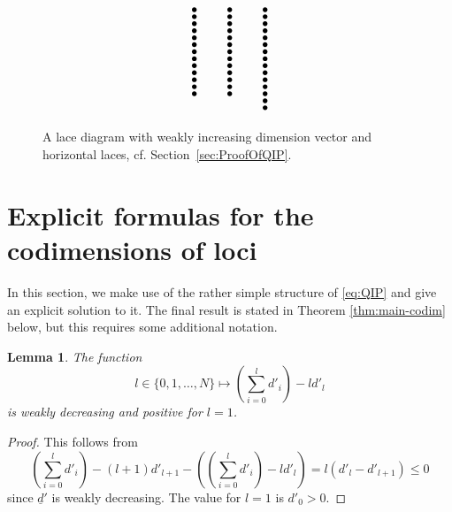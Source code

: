 \documentclass[a4paper]{amsart}
\newcommand{\ud}{\underline{d}}
\newtheorem{lemma}[thm]{Lemma}
\theoremstyle{plain}
\begin{document}
\begin{figure}
\begin{equation*}
\begin{tikzpicture}[baseline=-12]
 \node at (5,0)  {$\bullet$};
 \node at (5,-.2)  {$\bullet$};
 \node at (5,-.4)  {$\bullet$};
 \node at (5,-.6)  {$\bullet$};
 \node at (5,-.8)  {$\bullet$};
 \node at (5,-1)  {$\bullet$};
 \node at (5,-1.2)  {$\bullet$};
 \node at (5,-1.4)  {$\bullet$};
 \node at (5,-1.6)  {$\bullet$};
 \node at (5,-1.8)  {$\bullet$};
 \node at (5,-2)  {$\bullet$};
 \node at (5,-2.2)  {$\bullet$};
 \node at (5,-2.4)  {$\bullet$};

 \node at (6,0)  {$\bullet$};
 \node at (6,-.2)  {$\bullet$};
 \node at (6,-.4)  {$\bullet$};
 \node at (6,-.6)  {$\bullet$};
 \node at (6,-.8)  {$\bullet$};
 \node at (6,-1)  {$\bullet$};
 \node at (6,-1.2)  {$\bullet$};
 \node at (6,-1.4)  {$\bullet$};
 \node at (6,-1.6)  {$\bullet$};
 \node at (6,-1.8)  {$\bullet$};
 \node at (6,-2)  {$\bullet$};
 \node at (6,-2.2)  {$\bullet$};
 \node at (6,-2.4)  {$\bullet$};

 \node at (7,0)  {$\bullet$};
 \node at (7,-.2)  {$\bullet$};
 \node at (7,-.4)  {$\bullet$};
 \node at (7,-.6)  {$\bullet$};
 \node at (7,-.8)  {$\bullet$};
 \node at (7,-1)  {$\bullet$};
 \node at (7,-1.2)  {$\bullet$};
 \node at (7,-1.4)  {$\bullet$};
 \node at (7,-1.6)  {$\bullet$};
 \node at (7,-1.8)  {$\bullet$};
 \node at (7,-2)  {$\bullet$};
 \node at (7,-2.2)  {$\bullet$};
 \node at (7,-2.4)  {$\bullet$};
 \node at (7,-2.6)  {$\bullet$}; 
 \node at (7,-2.8)  {$\bullet$}; 

\end{tikzpicture}
\end{equation*}
\caption{A lace diagram with weakly increasing dimension vector and horizontal laces, cf. Section~\ref{sec:ProofOfQIP}.} \label{fig:largeLD}
\end{figure}

\section{Explicit formulas for the codimensions of loci} \label{sec:SolvingQIP}

In this section, we make use of the rather simple structure of \eqref{eq:QIP} and give an explicit solution to it. The final result is stated in Theorem \ref{thm:main-codim} below, but this requires some additional notation.

\begin{lemma}
    The function 
    \[l\in \{0,1,\ldots,N\}\mapsto \left(\sum_{i=0}^l d'_i\right) - l d'_l\]
    is weakly decreasing and positive for $l=1$.
\end{lemma}
\begin{proof}
    This follows from
    \[
\left(\sum_{i=0}^l d'_i\right) - (l+1) d'_{l+1} - \left(   \left(\sum_{i=0}^l d'_i\right) - l d'_l\right)=l(d'_l-d'_{l+1})\leq 0
    \]
since $\ud'$ is weakly decreasing. The value for $l=1$ is $d'_0>0$.
\end{proof}
\end{document}
